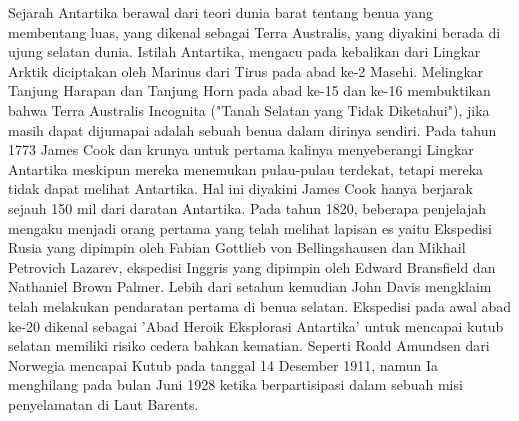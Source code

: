 Sejarah 
Antartika 
berawal
dari
teori
dunia 
barat 
tentang
benua
yang
membentang
luas, 
yang
dikenal
sebagai 
Terra Australis, 
yang 
diyakini berada di ujung selatan dunia. Istilah Antartika, mengacu pada kebalikan dari Lingkar Arktik diciptakan oleh Marinus dari Tirus pada abad ke-2 Masehi.
Melingkar Tanjung Harapan dan Tanjung Horn pada abad ke-15 dan ke-16 membuktikan bahwa Terra Australis Incognita ("Tanah Selatan yang Tidak Diketahui"), jika masih dapat dijumapai adalah sebuah benua dalam dirinya sendiri. Pada tahun 1773 James Cook dan krunya untuk pertama kalinya menyeberangi Lingkar Antartika meskipun mereka menemukan pulau-pulau terdekat, tetapi mereka tidak dapat melihat Antartika. Hal ini diyakini James Cook hanya berjarak sejauh 150 mil dari daratan Antartika.
Pada tahun 1820, beberapa penjelajah mengaku menjadi orang pertama yang telah melihat lapisan es yaitu Ekspedisi Rusia yang dipimpin oleh Fabian Gottlieb von Bellingshausen dan Mikhail Petrovich Lazarev, ekspedisi Inggris yang dipimpin oleh Edward Bransfield dan Nathaniel Brown Palmer. Lebih dari setahun kemudian John Davis mengklaim telah melakukan pendaratan pertama di benua selatan.
Ekspedisi pada awal abad ke-20 dikenal sebagai 'Abad Heroik Eksplorasi Antartika' untuk mencapai kutub selatan memiliki risiko cedera bahkan kematian. Seperti Roald Amundsen dari Norwegia mencapai Kutub pada tanggal 14 Desember 1911, namun Ia menghilang pada bulan Juni 1928 ketika berpartisipasi dalam sebuah misi penyelamatan di Laut Barents.

